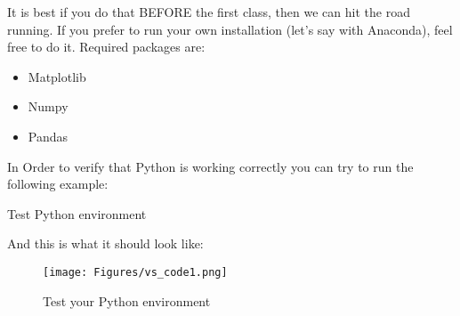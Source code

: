 \vspace{1cm}

It is best if you do that BEFORE the first class, then we can hit the road running. If you prefer to run your own installation (let's say with Anaconda),
feel free to do it. Required packages are:

\begin{itemize}
    \item Matplotlib
    \item Numpy
    \item Pandas
\end{itemize}

In Order to verify that Python is working correctly you can try to run the following example:

\vspace{1cm}

\begin{tcolorbox}[enhanced jigsaw,breakable,pad at break*=1mm,
    colback=blue!5!white,colframe=babyblueeyes,title=Solutions,
    watermark color=white]
    Test Python environment
    
\end{tcolorbox}

\newpage

And this is what it should look like:

\vspace{1cm}

\begin{figure}[h!]
    \centering
    \texttt{[image: Figures/vs\_code1.png]}
    \caption{Test your Python environment}
\end{figure}

%    
